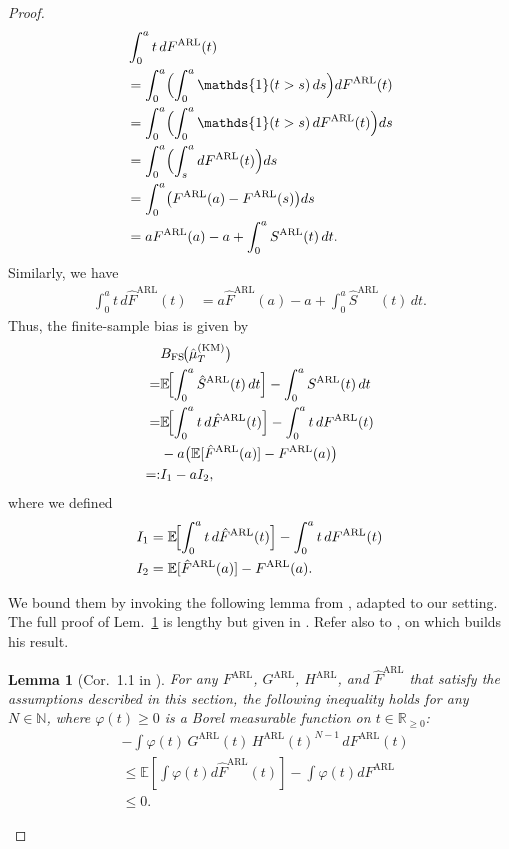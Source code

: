 \documentclass{article}
\theoremstyle{plain}
\newtheorem{lemma}[theorem]{Lemma}
\theoremstyle{definition}
\theoremstyle{remark}
\def\nn{\nonumber \\ }
\def\mbr{\mathbb{R}}
\def\mbn{\mathbb{N}}
\def\mbe{\mathbb{E}}
\def\mbone{\mathds{1}}
\begin{document}
\begin{proof}
    \begin{align}
      &\int_{0}^{a} t \, dF^\mathrm{ARL}(t) \nn
      &= \int_{0}^{a} \Bigl(\int_{0}^{a} \mbone(t>s)\,ds\Bigr) dF^\mathrm{ARL}(t)  \\
      &= \int_{0}^{a} \Bigl(\int_{0}^{a} \mbone(t>s)\,dF^\mathrm{ARL}(t)\Bigr) ds \\
      &= \int_{0}^{a} \Bigl(\int_{s}^{a} dF^\mathrm{ARL}(t)\Bigr) ds                \\
      &= \int_{0}^{a} \bigl(F^\mathrm{ARL}(a)-F^\mathrm{ARL}(s)\bigr) ds                          \\
      &=   a F^\mathrm{ARL}(a) - a  + \int_{0}^{a} S^\mathrm{ARL}(t)\,dt.
    \end{align}
    Similarly, we have
    \begin{align}
      \int_{0}^{a} t \, d\hat{F}^\mathrm{ARL}(t) &= a \hat{F}^\mathrm{ARL}(a) - a  + \int_{0}^{a} \hat{S}^\mathrm{ARL}(t)\,dt.
    \end{align}
    Thus, the finite-sample bias is given by
    \begin{align} 
     & B_{\mathrm{FS}}\!\bigl(\hat{\mu}_{T}^\mathrm{(KM)}\bigr)  \nn
      =& \mathbb{E}\!\Bigl[\int_{0}^{a} \hat{S}^{\mathrm{ARL}}(t)\,dt\Bigr]
      -  \int_{0}^{a} S^{\mathrm{ARL}}(t)\,dt  \nn
      =& \mathbb{E}\!\Bigl[\int_{0}^{a} t\,d\hat{F}^{\mathrm{ARL}}(t)\Bigr]
         - \int_{0}^{a} t\,dF^{\mathrm{ARL}}(t) \nn
         &- a \bigl(\mbe[\hat{F}^{\mathrm{ARL}}(a)] - F^{\mathrm{ARL}}(a)\bigr) \nn
     =:& I_1 - aI_2, \label{eq:tmp1}
    \end{align}
    where we defined
    \begin{align}
        & I_1 = \mathbb{E}\!\Bigl[\int_{0}^{a} t\,d\hat{F}^{\mathrm{ARL}}(t)\Bigr]
         - \int_{0}^{a} t\,dF^{\mathrm{ARL}}(t) \label{eq:tmp2} \\
        & I_2 = \mbe[\hat{F}^{\mathrm{ARL}}(a)] - F^{\mathrm{ARL}}(a). \label{eq:tmp3}
    \end{align}
    
    We bound them by invoking the following lemma from \citep{stute1994bias}, adapted to our setting.
    The full proof of Lem.~\ref{lem:Cor.1.1 in Stute1994} is lengthy but given in \citep{stute1994bias}. Refer also to \citep{stute1993strong}, on which \citet{stute1994bias} builds his result.
    \begin{lemma}[Cor.~1.1 in \citep{stute1994bias}] \label{lem:Cor.1.1 in Stute1994}
        For any $F^\mathrm{ARL}$, $G^\mathrm{ARL}$, $H^\mathrm{ARL}$, and $\hat{F}^\mathrm{ARL}$ that satisfy the assumptions described in this section, the following inequality holds for any $N \in \mbn$, where $\varphi(t) \geq 0$ is a Borel measurable function on $t \in \mbr_{\geq0}$:
        \begin{align}
            &-\int \varphi(t) \,G^\mathrm{ARL}(t)\,{H^\mathrm{ARL}}(t)^{N-1}\,dF^\mathrm{ARL}(t) \nn
            &\leq
            \mbe[\int \varphi(t)d\hat{F}^\mathrm{ARL}(t)] - \int \varphi(t) dF^\mathrm{ARL} \nn
            & \leq 0.
        \end{align} 
    \end{lemma}
    

\end{proof}
\end{document}
